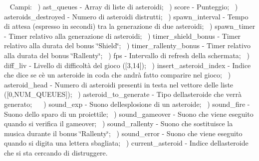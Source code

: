 ~\newline
Campi\+: ~) ast\+\_\+queues -\/ Array di liste di asteroidi; ~) score -\/ Punteggio; ~) asteroids\+\_\+destroyed -\/ Numero di asteroidi distrutti; ~) spawn\+\_\+interval -\/ Tempo di attesa (espresso in secondi) tra la generazione di due asteroidi; ~) spawn\+\_\+timer -\/ Timer relativo alla generazione di asteroidi; ~) timer\+\_\+shield\+\_\+bonus -\/ Timer relativo alla durata del bonus \char`\"{}\+Shield\char`\"{}; ~) timer\+\_\+rallenty\+\_\+bonus -\/ Timer relativo alla durata del bonus \char`\"{}\+Rallenty\char`\"{}; ~) fps -\/ Intervallo di refresh della schermata; ~) diff\+\_\+liv -\/ Livello di difficoltà del gioco (\mbox{[}3,14\mbox{]}); ~) insert\+\_\+asteroid\+\_\+index -\/ Indice che dice se c\textquotesingle{}è un asteroide in coda che andrà fatto comparire nel gioco; ~) asteroid\+\_\+head -\/ Numero di asteroidi presenti in testa nel vettore delle liste (\mbox{[}0,N\+U\+M\+\_\+\+Q\+U\+E\+U\+ES\mbox{]}); ~) asteroid\+\_\+to\+\_\+generate -\/ Tipo dell\textquotesingle{}asteroide che verrà generato; ~\newline
 ~) sound\+\_\+exp -\/ Suono dell\textquotesingle{}esplosione di un asteroide; ~) sound\+\_\+fire -\/ Suono dello sparo di un proiettile; ~) sound\+\_\+gameover -\/ Suono che viene eseguito quando si verifica il gameover; ~) sound\+\_\+rallenty -\/ Suono che sostituisce la musica durante il bonus \char`\"{}\+Rallenty\char`\"{}; ~) sound\+\_\+error -\/ Suono che viene eseguito quando si digita una lettera sbagliata; ~) current\+\_\+asteroid -\/ Indice dell\textquotesingle{}asteroide che si sta cercando di distruggere. ~\newline
